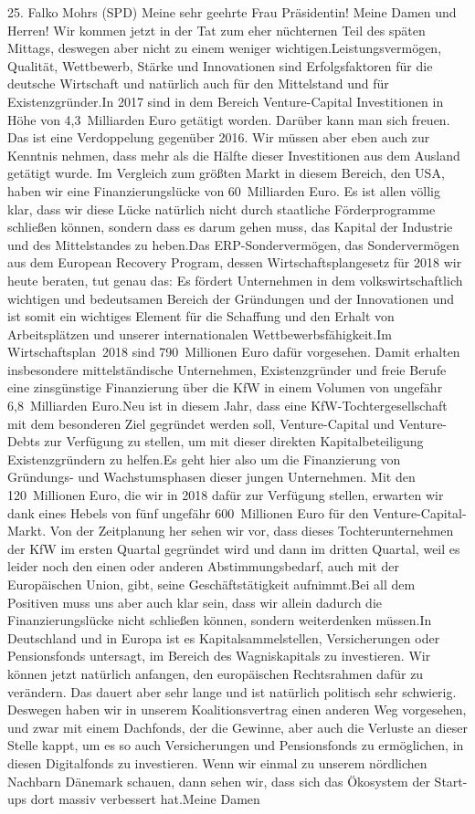 \documentclass{article}
\begin{document}
	25. Falko Mohrs (SPD) Meine sehr geehrte Frau Präsidentin! Meine Damen und Herren! Wir kommen jetzt in der Tat zum eher nüchternen Teil des späten Mittags, deswegen aber nicht zu einem weniger wichtigen.Leistungsvermögen, Qualität, Wettbewerb, Stärke und Innovationen sind Erfolgsfaktoren für die deutsche Wirtschaft und natürlich auch für den Mittelstand und für Existenzgründer.In 2017 sind in dem Bereich Venture-Capital Investitionen in Höhe von 4,3 Milliarden Euro getätigt worden. Darüber kann man sich freuen. Das ist eine Verdoppelung gegenüber 2016. Wir müssen aber eben auch zur Kenntnis nehmen, dass mehr als die Hälfte dieser Investitionen aus dem Ausland getätigt wurde. Im Vergleich zum größten Markt in diesem Bereich, den USA, haben wir eine Finanzierungslücke von 60 Milliarden Euro. Es ist allen völlig klar, dass wir diese Lücke natürlich nicht durch staatliche Förderprogramme schließen können, sondern dass es darum gehen muss, das Kapital der Industrie und des Mittelstandes zu heben.Das ERP-Sondervermögen, das Sondervermögen aus dem European Recovery Program, dessen Wirtschaftsplangesetz für 2018 wir heute beraten, tut genau das: Es fördert Unternehmen in dem volkswirtschaftlich wichtigen und bedeutsamen Bereich der Gründungen und der Innovationen und ist somit ein wichtiges Element für die Schaffung und den Erhalt von Arbeitsplätzen und unserer internationalen Wettbewerbsfähigkeit.Im Wirtschaftsplan 2018 sind 790 Millionen Euro dafür vorgesehen. Damit erhalten insbesondere mittelständische Unternehmen, Existenzgründer und freie Berufe eine zinsgünstige Finanzierung über die KfW in einem Volumen von ungefähr 6,8 Milliarden Euro.Neu ist in diesem Jahr, dass eine KfW-Tochtergesellschaft mit dem besonderen Ziel gegründet werden soll, Venture-Capital und Venture-Debts zur Verfügung zu stellen, um mit dieser direkten Kapitalbeteiligung Existenzgründern zu helfen.Es geht hier also um die Finanzierung von Gründungs- und Wachstumsphasen dieser jungen Unternehmen. Mit den 120 Millionen Euro, die wir in 2018 dafür zur Verfügung stellen, erwarten wir dank eines Hebels von fünf ungefähr 600 Millionen Euro für den Venture-Capital-Markt. Von der Zeitplanung her sehen wir vor, dass dieses Tochterunternehmen der KfW im ersten Quartal gegründet wird und dann im dritten Quartal, weil es leider noch den einen oder anderen Abstimmungsbedarf, auch mit der Europäischen Union, gibt, seine Geschäftstätigkeit aufnimmt.Bei all dem Positiven muss uns aber auch klar sein, dass wir allein dadurch die Finanzierungslücke nicht schließen können, sondern weiterdenken müssen.In Deutschland und in Europa ist es Kapitalsammelstellen, Versicherungen oder Pensionsfonds untersagt, im Bereich des Wagniskapitals zu investieren. Wir können jetzt natürlich anfangen, den europäischen Rechtsrahmen dafür zu verändern. Das dauert aber sehr lange und ist natürlich politisch sehr schwierig. Deswegen haben wir in unserem Koalitionsvertrag einen anderen Weg vorgesehen, und zwar mit einem Dachfonds, der die Gewinne, aber auch die Verluste an dieser Stelle kappt, um es so auch Versicherungen und Pensionsfonds zu ermöglichen, in diesen Digitalfonds zu investieren. Wenn wir einmal zu unserem nördlichen Nachbarn Dänemark schauen, dann sehen wir, dass sich das Ökosystem der Start-ups dort massiv verbessert hat.Meine Damen 
\end{document}
